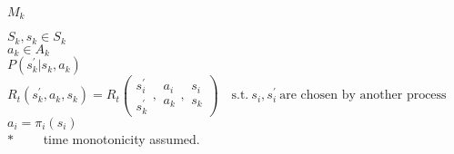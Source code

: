 \underline{$M_k$}\quad
\begin{minipage}[t]{5in}
$S_k, s_k\in S_k$\\
$a_k\in A_k$\\
$P(s^\prime_k|s_k,a_k)$\\
$R_t(s^\prime_k, a_k, s_k)=R_t\left(
\begin{array}{c}s^\prime_i \\ s^\prime_k \end{array},
\begin{array}{c}a_i \\ a_k\end{array},
\begin{array}{c}s_i \\ s_k \end{array}
\right)\quad\text{s.t.}\ s_i,s^\prime_i\ \text{are chosen by another process}$
$a_i=\pi_i(s_i)$\\
$\ast\qquad$ time monotonicity assumed.
\end{minipage}\\